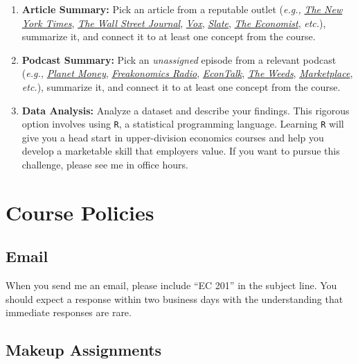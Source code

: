 \documentclass[11pt]{article}
\begin{document}
\begin{enumerate}
	\setlength{\itemsep}{0pt}
	\item \textbf{Article Summary:} Pick an article from a reputable outlet (\textit{e.g.,} \href{https://www.nytimes.com/}{\textit{The New York Times}}, \href{https://www.wsj.com/}{\textit{The Wall Street Journal}}, \href{https://www.vox.com/}{\textit{Vox}}, \href{https://slate.com/}{\textit{Slate}}, \href{https://www.economist.com/}{\textit{The Economist}}, \textit{etc.}), summarize it, and connect it to at least one concept from the course.
	\item \textbf{Podcast Summary:} Pick an \textit{unassigned} episode from a relevant podcast (\textit{e.g.,} \href{https://www.npr.org/sections/money/}{\textit{Planet Money}}, \href{https://www.npr.org/podcasts/452538045/freakonomics-radio}{\textit{Freakonomics Radio}}, \href{https://www.econtalk.org/}{\textit{EconTalk}}, \href{https://www.vox.com/the-weeds}{\textit{The Weeds}}, \href{https://www.npr.org/podcasts/381444600/marketplace}{\textit{Marketplace}}, \textit{etc.}), summarize it, and connect it to at least one concept from the course.
	\item \textbf{Data Analysis:} Analyze a dataset and describe your findings. This rigorous option involves using \texttt{R}, a statistical programming language. Learning \texttt{R} will give you a head start in upper-division economics courses and help you develop a marketable skill that employers value. If you want to pursue this challenge, please see me in office hours.
\end{enumerate}



\newpage

\section*{Course Policies}

\subsection*{Email} 

When you send me an email, please include ``EC 201'' in the subject line. You should expect a response within two business days with the understanding that immediate responses are rare. 

\subsection*{Makeup Assignments} 
\end{document}

